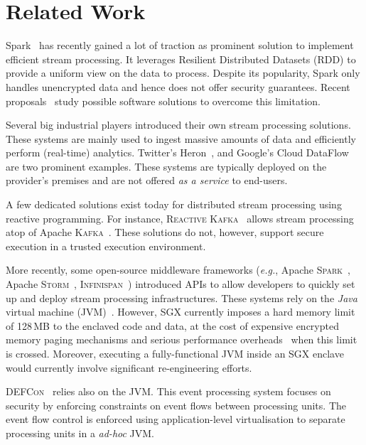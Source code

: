 \section{Related Work}\label{sec:rw}

Spark~\cite{Zaharia:2013:DSF:2517349.2522737} has recently gained a lot of traction as prominent solution to implement efficient stream processing.
It leverages Resilient Distributed Datasets (RDD) to provide a uniform view on the data to process.
Despite its popularity, Spark only handles unencrypted data and hence does not offer security guarantees.
Recent proposals~\cite{7840754} study possible software solutions to overcome this limitation.

Several big industrial players introduced their own stream processing solutions.
These systems are mainly used to ingest massive amounts of data and efficiently perform (real-time) analytics.
Twitter's Heron~\cite{Kulkarni:2015:THS:2723372.2742788}, and Google's Cloud DataFlow~\cite{Akidau:2015:DMP:2824032.2824076} are two prominent examples.
These systems are typically deployed on the provider's premises and are not offered \emph{as a service} to end-users.

A few dedicated solutions exist today for distributed stream processing using reactive programming.
For instance, \textsc{Reactive Kafka}~\cite{reactivekafka} allows stream processing atop of Apache \textsc{Kafka}~\cite{apachekafka,kreps2011kafka}.
These solutions do not, however, support secure execution in a trusted execution environment.

More recently, some open-source middleware frameworks (\emph{e.g.}, Apache \textsc{Spark}~\cite{apachesparkstreaming}, Apache \textsc{Storm}~\cite{apachestorm}, \textsc{Infinispan}~\cite{infinispan}) introduced APIs to allow developers to quickly set up and deploy stream processing infrastructures.
These systems rely on the \emph{Java} virtual machine (JVM)~\cite{lindholm2014java}.
However, SGX currently imposes a hard memory limit of 128\,MB to the enclaved code and data, at the cost of expensive encrypted memory paging mechanisms and serious performance overheads~\cite{pires_scbr:2016,brenner_securekeeper:_2016} when this limit is crossed.
Moreover, executing a fully-functional JVM inside an SGX enclave would currently involve significant re-engineering efforts.

\textsc{DEFCon}~\cite{Migliavacca:2010:DHE} relies also on the JVM.
This event processing system focuses on security by enforcing constraints on event flows between processing units.
The event flow control is enforced using application-level virtualisation to separate processing units in a \emph{ad-hoc} JVM.

